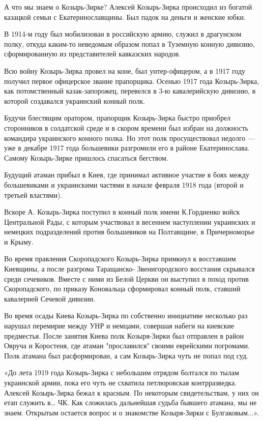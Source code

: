 А что мы знаем о Козырь-Зирке? Алексей Козырь-Зирка происходил из богатой
казацкой семьи с Екатеринославщины. Был падок на деньги и женские юбки. 

В 1914-м году был мобилизован в российскую армию, служил в драгунском полку,
откуда каким-то неведомым образом попал в Туземную конную дивизию,
сформированную из представителей кавказских народов. 

Всю войну Козырь-Зирка провел на коне, был унтер-офицером, а в 1917 году
получил первое офицерское звание прапорщика. Осенью 1917 года Козырь-Зирка,
как потомственный казак-запорожец, перевелся в 3-ю кавалерийскую дивизию, в
которой создавался украинский конный полк. 

Будучи блестящим оратором, прапорщик Козырь-Зирка быстро приобрел
сторонников в солдатской среде и в скором времени был избран на должность
командира украинского конного полка. Но этот полк просуществовал недолго —
уже в декабре 1917 года большевики разгромили его в районе Екатеринослава.
Самому Козырь-Зирке пришлось спасаться бегством. 

Будущий атаман прибыл в Киев, где принимал активное участие в боях между
большевиками и украинскими частями в начале февраля 1918 года (второй и
третьей властями). 

Вскоре А. Козырь-Зирка поступил в конный полк имени К.Гордиенко войск
Центральной Рады, с которым участвовал в весеннем наступлении украинских и
немецких подразделений против большевиков на Полтавщине, в Причерноморье и
Крыму. 

Во время правления Скоропадского Козырь-Зирка примкнул к восставшим
Киевщины, а после разгрома Таращанско- Звенигородского восстания скрывался
среди сечевиков. Вместе с ними из Белой Церкви он выступил в поход против
Скоропадского, по приказу Коновальца сформировал конный полк, ставший
кавалерией Сечевой дивизии. 

Во время осады Киева Козырь-Зирка по собственно инициативе несколько раз
нарушал перемирие между УНР и немцами, совершая набеги на киевские
предместья. После занятия Киева полк Козыря-Зирки был отправлен в район
Овруча и Коростеня, где атаман "прославился" своими еврейскими погромами.
Полк атамана был расформирован, а сам Козырь-Зирка чуть не попал под суд. 

«До лета 1919 года Козырь-Зирка с небольшим отрядом болтался по тылам
украинской армии, пока его чуть не схватила петлюровская контрразведка.
Алексей Козырь-Зирка бежал к красным. По некоторым свидетельствам, у них
он етап служить в… ЧК. Как сложилась дальнейшая судьба бывшего атамана, мы
не знаем. Открытым остается вопрос и о знакомстве Козыря-Зирки с
Булгаковым...».

